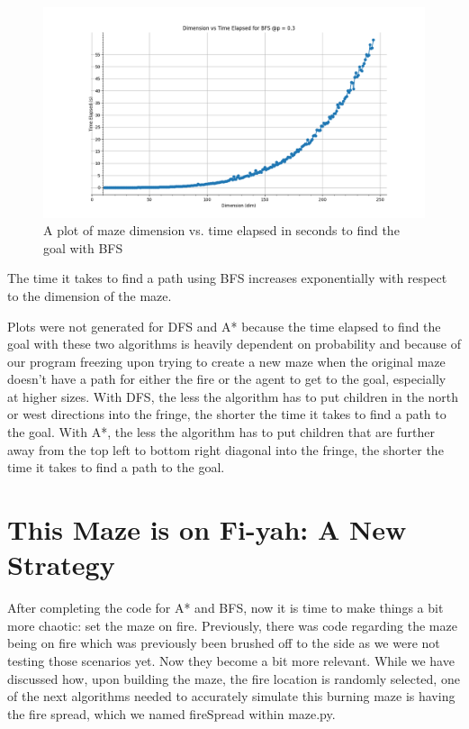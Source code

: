 \documentclass[11pt]{article}
\begin{document}
\begin{figure}[h]
\centering
\includegraphics[scale=0.5]{dimVStimeBFS_MAX243.PNG}
\caption{A plot of maze dimension vs. time elapsed in seconds to find the goal with BFS}
\label{BFStime}
\end{figure}
The time it takes to find a path using BFS increases exponentially with respect to the dimension of the maze.

Plots were not generated for DFS and A* because the time elapsed to find the goal with these two algorithms is heavily dependent on probability and because of our program freezing upon trying to create a new maze when the original maze doesn't have a path for either the fire or the agent to get to the goal, especially at higher sizes. With DFS, the less the algorithm has to put children in the north or west directions into the fringe, the shorter the time it takes to find a path to the goal. With A*, the less the algorithm has to put children that are further away from the top left to bottom right diagonal into the fringe, the shorter the time it takes to find a path to the goal.
	\pagebreak
\section{This Maze is on Fi-yah: A New Strategy}
After completing the code for A* and BFS, now it is time to make things a bit more chaotic: set the maze on fire. Previously, there was code regarding the maze being on fire which was previously been brushed off to the side as we were not testing those scenarios yet. Now they become a bit more relevant.
While we have discussed how, upon building the maze, the fire location is randomly selected, one of the next algorithms needed to accurately simulate this burning maze is having the fire spread, which we named fireSpread within maze.py.
\end{document}
